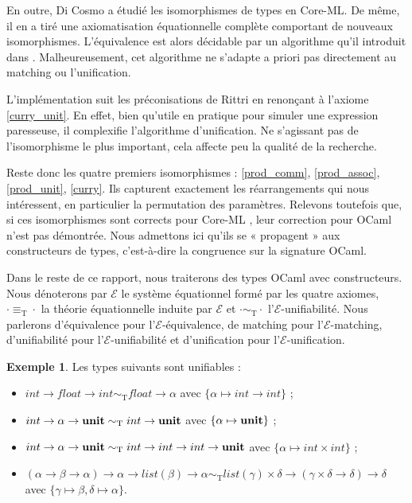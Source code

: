 \documentclass[a4paper]{report}
\theoremstyle{definition}
\newtheorem{exemple}[theoreme]{Exemple}
\newcommand{\unit}{\bold{unit}}
\newcommand{\E}{\mathscr{E}}
\newcommand{\T}{\mathrm{T}}
\begin{document}
En outre, Di Cosmo \cite{DiCosmo92} a étudié les isomorphismes de types en Core-ML. De même, il en a tiré une axiomatisation équationnelle complète comportant de nouveaux isomorphismes. L'équivalence est alors décidable par un algorithme qu'il introduit dans \cite{DiCosmo95}. Malheureusement, cet algorithme ne s'adapte a priori pas directement au matching ou l'unification.

L'implémentation suit les préconisations de Rittri en renonçant à l'axiome \eqref{curry_unit}. En effet, bien qu'utile en pratique pour simuler une expression paresseuse, il complexifie l'algorithme d'unification. Ne s'agissant pas de l'isomorphisme le plus important, cela affecte peu la qualité de la recherche.

Reste donc les quatre premiers isomorphismes : \eqref{prod_comm}, \eqref{prod_assoc}, \eqref{prod_unit}, \eqref{curry}. Ils capturent exactement les réarrangements qui nous intéressent, en particulier la permutation des paramètres. Relevons toutefois que, si ces isomorphismes sont corrects pour Core-ML \cite{DiCosmo93}, leur correction pour OCaml n'est pas démontrée. Nous admettons ici qu'ils se « propagent » aux constructeurs de types, c'est-à-dire la congruence sur la signature OCaml.

Dans le reste de ce rapport, nous traiterons des types OCaml avec constructeurs. Nous dénoterons par $\E$ le système équationnel formé par les quatre axiomes, $\cdot \equiv_\T \cdot$ la théorie équationnelle induite par $\E$ et $\cdot \sim_\T \cdot$ l'$\E$-unifiabilité. Nous parlerons d'équivalence pour l'$\E$-équivalence, de matching pour l'$\E$-matching, d'unifiabilité pour l'$\E$-unifiabilité et d'unification pour l'$\E$-unification.

\begin{exemple}
	Les types suivants sont unifiables :
	\begin{itemize}
		\item $int \rightarrow float \rightarrow int \sim_\T float \rightarrow \alpha$ avec $\{ \alpha \mapsto int \rightarrow int \}$ ;
		\item $int \rightarrow \alpha \rightarrow \unit \sim_\T int \rightarrow \unit$ avec $\{ \alpha \mapsto \unit \}$ ;
		\item $int \rightarrow \alpha \rightarrow \unit \sim_\T int \rightarrow int \rightarrow int \rightarrow \unit$ avec $\{ \alpha \mapsto int \times int \}$ ;
		\item $(\alpha \rightarrow \beta \rightarrow \alpha) \rightarrow \alpha \rightarrow list (\beta) \rightarrow \alpha \sim_\T list (\gamma) \times \delta \rightarrow (\gamma \times \delta \rightarrow \delta) \rightarrow \delta$ \\ avec $\{ \gamma \mapsto \beta, \delta \mapsto \alpha \}$.
	\end{itemize}
\end{exemple}
\end{document}

